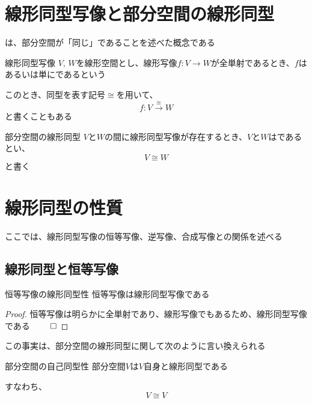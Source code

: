 \documentclass[../../../topic_linear-algebra]{subfiles}
\begin{document}
\sectionline
\section{線形同型写像と部分空間の線形同型}

は、部分空間が「同じ」であることを述べた概念である

\begin{definition}{線形同型写像}
  $V,\,W$を線形空間とし、線形写像$f\colon V \to W$が全単射であるとき、$f$はあるいは単にであるという

  このとき、同型を表す記号$\cong$を用いて、
  \begin{equation*}
    f\colon V \xrightarrow{\cong} W
  \end{equation*}
  と書くこともある
\end{definition}

\begin{definition}{部分空間の線形同型}
  $V$と$W$の間に線形同型写像が存在するとき、$V$と$W$はであるとい、
  \begin{equation*}
    V \cong W
  \end{equation*}
  と書く
\end{definition}

\sectionline
\section{線形同型の性質}

ここでは、線形同型写像の恒等写像、逆写像、合成写像との関係を述べる

\subsection{線形同型と恒等写像}

\begin{theorem}{恒等写像の線形同型性}
  恒等写像は線形同型写像である
\end{theorem}

\begin{proof}
  恒等写像は明らかに全単射であり、線形写像でもあるため、線形同型写像である $\qed$
\end{proof}

この事実は、部分空間の線形同型に関して次のように言い換えられる

\begin{theorem}{部分空間の自己同型性}
  部分空間$V$は$V$自身と線形同型である

  すなわち、
  \begin{equation*}
    V \cong V
  \end{equation*}
\end{theorem}
\end{document}
